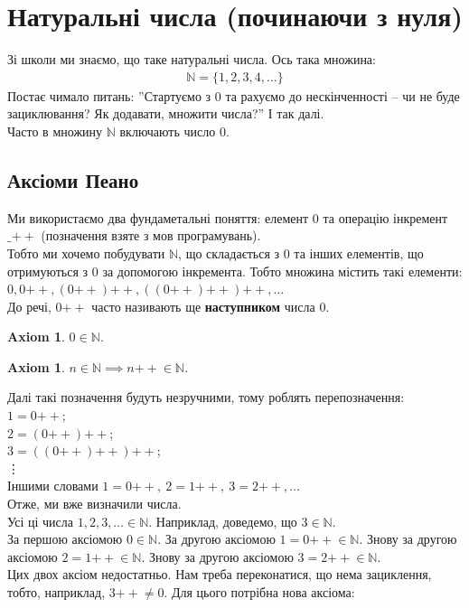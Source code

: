 \documentclass[a4paper, 14pt]{extarticle}
\theoremstyle{theoremdd}
\theoremstyle{theoremdd}
\theoremstyle{theoremdd}
\newtheorem{axiom}[theorem]{Axiom}
\theoremstyle{theoremdd}
\theoremstyle{theoremdd}
\theoremstyle{theoremdd}
\theoremstyle{theoremdd}
\theoremstyle{theoremdd}
\theoremstyle{theoremdd}
\theoremstyle{theoremdd}
\theoremstyle{theoremdd}
\theoremstyle{theoremdd}
\theoremstyle{theoremdd}
\theoremstyle{theoremdd}
\theoremstyle{theoremdd}
\theoremstyle{theoremdd}
\newcommand{\plusplus}{\!\!\mathrel{++}}
\begin{document}
\section{Натуральні числа (починаючи з нуля)}
Зі школи ми знаємо, що таке натуральні числа. Ось така множина:
\begin{align*}
\mathbb{N} = \{1,2,3,4,\dots \}
\end{align*}
Постає чимало питань: ''Стартуємо з $0$ та рахуємо до нескінченності -- чи не буде зациклювання? Як додавати, множити числа?'' І так далі.
\bigskip \\
Часто в множину $\mathbb{N}$ включають число $0$.

\subsection{Аксіоми Пеано}
Ми використаємо два фундаметальні поняття: елемент $0$ та операцію інкремент $\_\plusplus$ (позначення взяте з мов програмувань).\\
Тобто ми хочемо побудувати $\mathbb{N}$, що складається з $0$ та інших елементів, що отримуються з $0$ за допомогою інкремента. Тобто множина містить такі елементи:\\
$0, 0 \plusplus , (0 \plusplus) \plusplus, ((0 \plusplus)\plusplus)\plusplus, \dots$\\
До речі, $0 \plusplus$ часто називають ще \textbf{наступником} числа $0$.

\begin{axiom}
$0 \in \mathbb{N}$.
\end{axiom}

\begin{axiom}
$n \in \mathbb{N} \implies n \plusplus \in \mathbb{N}$.
\end{axiom}

Далі такі позначення будуть незручними, тому роблять перепозначення:\\
$1 = 0\plusplus$;\\
$2 = (0\plusplus)\plusplus$;\\
$3 = ((0\plusplus)\plusplus)\plusplus$;\\
\vdots \\
Іншими словами $1 = 0\plusplus,\ 2 = 1\plusplus,\ 3 = 2\plusplus, \dots$\\
Отже, ми вже визначили числа.
\bigskip \\
Усі ці числа $1,2,3,\dots \in \mathbb{N}$. Наприклад, доведемо, що $3 \in \mathbb{N}$.\\
За першою аксіомою $0 \in \mathbb{N}$. За другою аксіомою $1 = 0\plusplus \in \mathbb{N}$. Знову за другою аксіомою $2 = 1\plusplus \in \mathbb{N}$. Знову за другою аксіомою $3 = 2\plusplus \in \mathbb{N}$.
\bigskip \\
Цих двох аксіом недостатньо. Нам треба переконатися, що нема зациклення, тобто, наприклад, $3\plusplus \neq 0$. Для цього потрібна нова аксіома:
\end{document}
